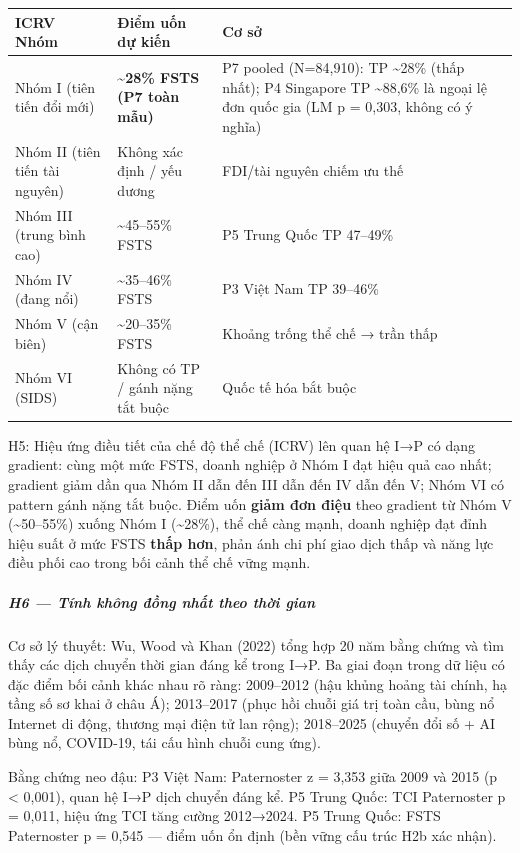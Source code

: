 \documentclass[12pt,a4paper]{article}
\begin{document}
\begin{longtable}[]{@{}lll@{}}
\toprule\noalign{}
ICRV Nhóm & Điểm uốn dự kiến & Cơ sở \\
\midrule\noalign{}
\endhead
\bottomrule\noalign{}
\endlastfoot
Nhóm I (tiên tiến đổi mới) & \textbf{\textasciitilde28\% FSTS (P7 toàn
mẫu)} & P7 pooled (N=84,910): TP \textasciitilde28\% (thấp nhất); P4
Singapore TP \textasciitilde88,6\% là ngoại lệ đơn quốc gia (LM p =
0,303, không có ý nghĩa) \\
Nhóm II (tiên tiến tài nguyên) & Không xác định / yếu dương & FDI/tài
nguyên chiếm ưu thế \\
Nhóm III (trung bình cao) & \textasciitilde45--55\% FSTS & P5 Trung Quốc
TP 47--49\% \\
Nhóm IV (đang nổi) & \textasciitilde35--46\% FSTS & P3 Việt Nam TP
39--46\% \\
Nhóm V (cận biên) & \textasciitilde20--35\% FSTS & Khoảng trống thể chế
→ trần thấp \\
Nhóm VI (SIDS) & Không có TP / gánh nặng tắt buộc & Quốc tế hóa bắt
buộc \\
\end{longtable}

H5: Hiệu ứng điều tiết của chế độ thể chế (ICRV) lên quan hệ I→P có dạng
gradient: cùng một mức FSTS, doanh nghiệp ở Nhóm I đạt hiệu quả cao
nhất; gradient giảm dần qua Nhóm II dẫn đến III dẫn đến IV dẫn đến V;
Nhóm VI có pattern gánh nặng tắt buộc. Điểm uốn \textbf{giảm đơn điệu}
theo gradient từ Nhóm V (\textasciitilde50--55\%) xuống Nhóm I
(\textasciitilde28\%), thể chế càng mạnh, doanh nghiệp đạt đỉnh hiệu
suất ở mức FSTS \textbf{thấp hơn}, phản ánh chi phí giao dịch thấp và
năng lực điều phối cao trong bối cảnh thể chế vững mạnh.

\hypertarget{h6--tuxednh-khuxf4ng-ux111ux1ed3ng-nhux1ea5t-theo-thux1eddi-gian}{%
\subparagraph{H6 --- Tính không đồng nhất theo thời
gian}\label{h6--tuxednh-khuxf4ng-ux111ux1ed3ng-nhux1ea5t-theo-thux1eddi-gian}}

Cơ sở lý thuyết: Wu, Wood và Khan (2022) tổng hợp 20 năm bằng chứng và
tìm thấy các dịch chuyển thời gian đáng kể trong I→P. Ba giai đoạn trong
dữ liệu có đặc điểm bối cảnh khác nhau rõ ràng: 2009--2012 (hậu khủng
hoảng tài chính, hạ tầng số sơ khai ở châu Á); 2013--2017 (phục hồi
chuỗi giá trị toàn cầu, bùng nổ Internet di động, thương mại điện tử lan
rộng); 2018--2025 (chuyển đổi số + AI bùng nổ, COVID-19, tái cấu hình
chuỗi cung ứng).

Bằng chứng neo đậu: P3 Việt Nam: Paternoster z = 3,353 giữa 2009 và 2015
(p \textless{} 0,001), quan hệ I→P dịch chuyển đáng kể. P5 Trung Quốc:
TCI Paternoster p = 0,011, hiệu ứng TCI tăng cường 2012→2024. P5 Trung
Quốc: FSTS Paternoster p = 0,545 --- điểm uốn ổn định (bền vững cấu trúc
H2b xác nhận).
\end{document}
